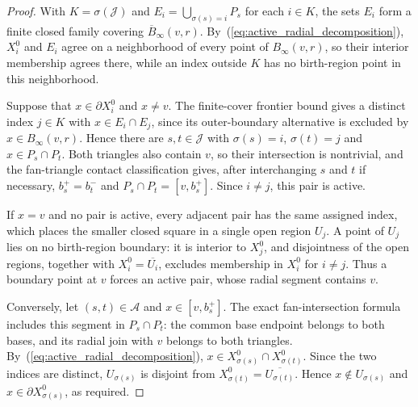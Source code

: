 \begin{proof}\leanok
    With $K=\sigma(\mathcal J)$ and
    $E_i=\bigcup_{\sigma(s)=i}P_s$ for each $i\in K$, the sets $E_i$ form
    a finite closed family covering
    $\overline B_\infty(v,r)$.
    By~(\ref{eq:active_radial_decomposition}), $X_i^0$ and $E_i$
    agree on a neighborhood of every point of $B_\infty(v,r)$, so
    their interior membership agrees there, while an index
    outside $K$ has no birth-region point in this neighborhood.

    Suppose that $x\in\partial X_i^0$ and $x\ne v$.
    The finite-cover frontier bound gives a distinct index
    $j\in K$ with $x\in E_i\cap E_j$, since its outer-boundary alternative
    is excluded by $x\in B_\infty(v,r)$.
    Hence there are $s,t\in\mathcal J$ with $\sigma(s)=i$, $\sigma(t)=j$
    and $x\in P_s\cap P_t$.
    Both triangles also contain $v$, so their intersection is
    nontrivial, and the fan-triangle contact classification gives, after
    interchanging $s$ and $t$ if necessary,
    $b_s^+=b_t^-$ and $P_s\cap P_t=[v,b_s^+]$.
    Since $i\ne j$, this pair is active.

    If $x=v$ and no pair is active, every adjacent pair has the same
    assigned index, which places the smaller
    closed square in a single open region $U_j$.
    A point of $U_j$ lies on no birth-region boundary: it is interior to $X_j^0$,
    and disjointness of the open regions, together with
    $X_i^0=\overline{U_i}$, excludes membership in $X_i^0$ for $i\ne j$.
    Thus a boundary point at $v$ forces an active pair, whose radial
    segment contains $v$.

    Conversely, let $(s,t)\in\mathcal A$ and $x\in[v,b_s^+]$.
    The exact fan-intersection formula includes this segment in
    $P_s\cap P_t$: the common base endpoint belongs to both bases,
    and its radial join with $v$ belongs to both triangles.
    By~(\ref{eq:active_radial_decomposition}),
    $x\in X_{\sigma(s)}^0\cap X_{\sigma(t)}^0$.
    Since the two indices are distinct,
    $U_{\sigma(s)}$ is disjoint from
    $X_{\sigma(t)}^0=\overline{U_{\sigma(t)}}$.
    Hence $x\notin U_{\sigma(s)}$ and
    $x\in\partial X_{\sigma(s)}^0$, as required.
\end{proof}

